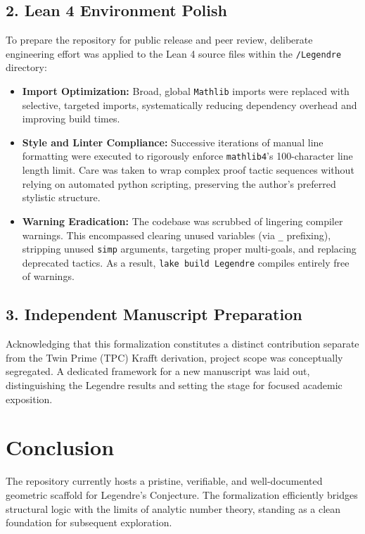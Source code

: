 \documentclass[11pt,a4paper]{article}
\begin{document}
\subsection*{2. Lean 4 Environment Polish}
To prepare the repository for public release and peer review, deliberate engineering effort was
applied to the Lean 4 source files within the \texttt{/Legendre} directory:
\begin{itemize}
    \item \textbf{Import Optimization:} Broad, global \texttt{Mathlib} imports were replaced
    with selective, targeted imports, systematically reducing dependency overhead and improving
    build times.
    \item \textbf{Style and Linter Compliance:} Successive iterations of manual line formatting
    were executed to rigorously enforce \texttt{mathlib4}'s 100-character line length limit.
    Care was taken to wrap complex proof tactic sequences without relying on automated python
    scripting, preserving the author's preferred stylistic structure.
    \item \textbf{Warning Eradication:} The codebase was scrubbed of lingering compiler warnings.
    This encompassed clearing unused variables (via \texttt{\_} prefixing), stripping unused
    \texttt{simp} arguments, targeting proper multi-goals, and replacing deprecated tactics.
    As a result, \texttt{lake build Legendre} compiles entirely free of warnings.
\end{itemize}

\subsection*{3. Independent Manuscript Preparation}
Acknowledging that this formalization constitutes a distinct contribution separate from the
Twin Prime (TPC) Krafft derivation, project scope was conceptually segregated. A dedicated
framework for a new manuscript was laid out, distinguishing the Legendre results and setting
the stage for focused academic exposition.

\section*{Conclusion}
The repository currently hosts a pristine, verifiable, and well-documented geometric scaffold
for Legendre's Conjecture. The formalization efficiently bridges structural logic with the limits
of analytic number theory, standing as a clean foundation for subsequent exploration.
\end{document}
